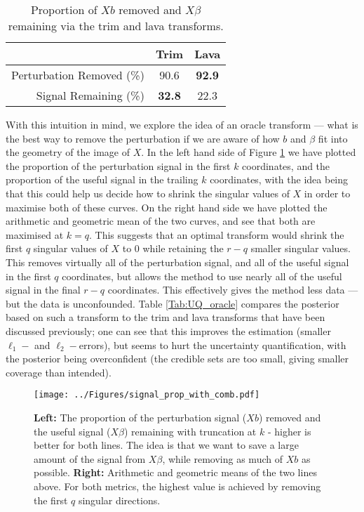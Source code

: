 \documentclass[11pt]{article}
\numberwithin{equation}{section}
\begin{document}
\begin{table}
	\centering
\begin{tabular}{r|cc}
\toprule
               			& Trim & Lava \\ \hline
Perturbation Removed (\%)    & 90.6 & \textbf{92.9} \\ \hline
Signal Remaining (\%) 		& \textbf{32.8} & 22.3 \\
\bottomrule
\end{tabular} 
\caption{Proportion of  $Xb$ removed and $X\beta$ remaining via the trim and lava transforms.}
\label{Tab:proportions}
\end{table}

With this intuition in mind, we explore the idea of an oracle transform --- what is the best way to remove the perturbation if we are aware of how $b$ and $\beta$ fit into the geometry of the image of $X$. In the left hand side of Figure \ref{fig:transformed_coordinates} we have plotted the proportion of the perturbation signal in the first $k$ coordinates, and the proportion of the useful signal in the trailing $k$ coordinates, with the idea being that this could help us decide how to shrink the singular values of $X$ in order to maximise both of these curves. On the right hand side we have plotted the arithmetic and geometric mean of the two curves, and see that both are maximised at $k = q$. This suggests that an optimal transform would shrink the first $q$ singular values of $X$ to 0 while retaining the $r - q$ smaller singular values. This removes virtually all of the perturbation signal, and all of the useful signal in the first $q$ coordinates, but allows the method to use nearly all of the useful signal in the final $r - q$ coordinates. This effectively gives the method less data --- but the data is unconfounded. Table \ref{Tab:UQ_oracle} compares the posterior based on such a transform to the trim and lava transforms that have been discussed previously; one can see that this improves the estimation (smaller $\ell_1-$ and $\ell_2-$errors), but seems to hurt the uncertainty quantification, with the posterior being overconfident (the credible sets are too small, giving smaller coverage than intended).

\begin{figure}[h]
\centering
  \texttt{[image: ../Figures/signal\_prop\_with\_comb.pdf]}
  \caption{\textbf{Left:} The proportion of the perturbation signal ($Xb$) removed and the useful signal ($X \beta$) remaining with truncation at $k$ - higher is better for both lines. The idea is that we want to save a large amount of the signal from $X \beta$, while removing as much of $X b$ as possible.
  \textbf{Right:} Arithmetic and geometric means of the two lines above. For both metrics, the highest value is achieved by removing the first $q$ singular directions. }
  \label{fig:transformed_coordinates}
\end{figure}
\end{document}
